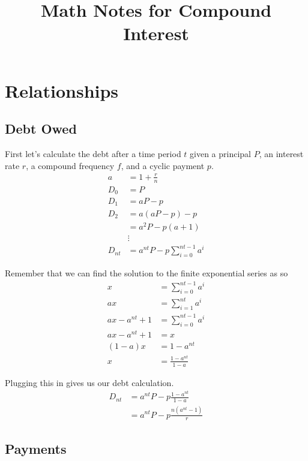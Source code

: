 \documentclass[12pt]{article}
\title{Math Notes for Compound Interest}
\author{}
\date{}
\begin{document}
\maketitle

\section{Relationships}

\subsection{Debt Owed}

First let's calculate the debt after a time period $t$ given a principal $P$, an
interest rate $r$, a compound frequency $f$, and a cyclic payment $p$.
\begin{align*}
    a &= 1 + \frac{r}{n}\\
    D_0 &= P\\
    D_1 &= aP - p\\
    D_2 &= a(aP - p) - p\\
        &= a^2 P - p (a + 1)\\
        &\vdots\\
    D_{nt} &= a^{nt} P - p \sum_{i = 0}^{nt - 1} a^i
\end{align*}

Remember that we can find the solution to the finite exponential series as so
\begin{align*}
    x &= \sum_{i = 0}^{nt - 1} a^i\\
    ax &= \sum_{i = 1}^{nt} a^i\\
    ax - a^{nt} + 1 &= \sum_{i = 0}^{nt - 1} a^i\\
    ax - a^{nt} + 1 &= x\\
    (1 - a) x &= 1 - a^{nt}\\
    x &= \frac{1 - a^{nt}}{1 - a}
\end{align*}

Plugging this in gives us our debt calculation.
\begin{align*}
    D_{nt} &= a^{nt} P - p \frac{1 - a^{nt}}{1 - a}\\
           &= a^{nt} P - p \frac{n (a^{nt} - 1)}{r}
\end{align*}


\subsection{Payments}
\end{document}
